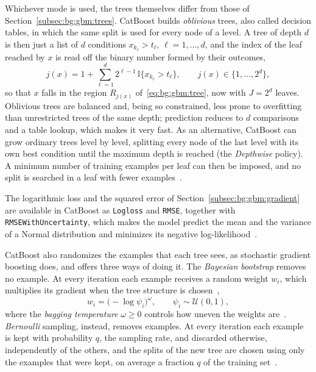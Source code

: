 Whichever mode is used, the trees themselves differ from those of
Section~\ref{subsec:bg:gbm:trees}. CatBoost builds \emph{oblivious} trees,
also called decision tables, in which the same split is used for every node of
a level. A tree of depth $d$ is then
just a list of $d$ conditions $x_{k_\ell} > t_\ell$, $\ell = 1, \dots, d$, and
the index of the leaf reached by $x$ is read off the binary number formed by
their outcomes,
\begin{equation}
j(x) = 1 + \sum_{\ell=1}^{d} 2^{\ell - 1}\, \mathbb{I}\{x_{k_\ell} > t_\ell\},
\qquad j(x) \in \{1, \dots, 2^{d}\},
\label{eq:bg:gbm:oblivious}
\end{equation}
so that $x$ falls in the region $R_{j(x)}$ of~\eqref{eq:bg:gbm:tree}, now with
$J = 2^d$ leaves. Oblivious trees are balanced and, being so constrained,
less prone to overfitting than unrestricted trees of the same depth;
prediction reduces to $d$ comparisons and a table lookup, which makes it very
fast. As an alternative, CatBoost can
grow ordinary trees level by level, splitting every node of the last level
with its own best condition until the maximum depth is reached (the
\emph{Depthwise} policy). A minimum number of training examples per leaf can
then be imposed, and no split is searched in a leaf with fewer
examples~\cite{catboostdocs}.

The logarithmic loss and the squared error of
Section~\ref{subsec:bg:gbm:gradient} are available in CatBoost as
\texttt{Logloss} and \texttt{RMSE}, together with \texttt{RMSEWithUncertainty},
which makes the model predict the mean and the variance of a Normal
distribution and minimizes its negative log-likelihood~\cite{malinin2021}.

CatBoost also randomizes the examples that each tree sees, as
stochastic gradient boosting does, and offers three ways of doing it. The
\emph{Bayesian bootstrap} removes no example. At every iteration each example
receives a random weight $w_i$, which multiplies its gradient when the tree
structure is chosen~\cite{rubin1981},
\begin{equation}
w_i = \bigl( -\log \psi_i \bigr)^{\omega},
\qquad \psi_i \sim \mathcal{U}(0, 1),
\label{eq:bg:gbm:bayesboot}
\end{equation}
where the \emph{bagging temperature} $\omega \ge 0$ controls how uneven the
weights are~\cite{catboostdocs}. \emph{Bernoulli} sampling, instead,
removes examples. At every iteration each example is kept with probability
$q$, the sampling rate, and discarded otherwise, independently of the others,
and the splits of the new tree are chosen using only the examples that were
kept, on average a fraction $q$ of the training
set~\cite{catboostbootstrap}.


